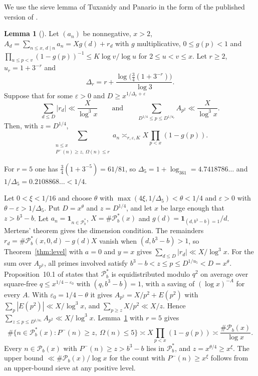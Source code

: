 \documentclass[11pt]{amsart}
\makeatletter
\theoremstyle{definition}
\newtheorem{lemma}[theorem]{Lemma}
\numberwithin{equation}{section}
\renewenvironment{proof}[1][\proofname]{\par\pushQED{\qed}\normalfont\topsep6\p@\@plus6\p@\relax\trivlist\item[\hskip\labelsep\upshape#1.]\ignorespaces}{\popQED\endtrivlist\@endpefalse}
\newcommand{\PP}{\mathscr{P}}
\makeatother
\begin{document}
We use the sieve lemma of Tuxanidy and Panario in the form of the published version of \cite{TP}.

\begin{lemma}[{\cite[Lemma~11.1]{TP}}]\label{lem:sieve}
Let $(a_n)$ be nonnegative, $x>2$, $A_d=\sum_{n\le x,\,d\mid n}a_n=Xg(d)+r_d$ with $g$ multiplicative, $0\le g(p)<1$ and $\prod_{u\le p<v}(1-g(p))^{-1}\le K\log v/\log u$ for $2\le u<v\le x$. Let $r\ge2$, $u_r=1+3^{-r}$ and
\[
\Delta_r=r+\frac{\log\bigl(\frac34(1+3^{-r})\bigr)}{\log3}.
\]
Suppose that for some $\varepsilon>0$ and $D\ge x^{1/\Delta_r+\varepsilon}$
\[
\sum_{d\le D}|r_d|\ll\frac{X}{\log^3x}\qquad\text{and}\qquad\sum_{D^{1/4}\le p\le D^{1/u_r}}A_{p^2}\ll\frac{X}{\log^3x}.
\]
Then, with $z=D^{1/4}$,
\[
\sum_{\substack{n\le x\\P^-(n)\ge z,\ \Omega(n)\le r}}a_n\asymp_{r,\varepsilon,K}X\prod_{p<x}(1-g(p)).
\]
\end{lemma}

For $r=5$ one has $\frac34(1+3^{-5})=61/81$, so $\Delta_5=1+\log_361=4.7418786\ldots$ and $1/\Delta_5=0.2108868\ldots<1/4$.

\begin{proof}[Proof of Corollary~\ref{cor:five}]
Let $0<\xi<1/16$ and choose $\theta$ with $\max(4\xi,1/\Delta_5)<\theta<1/4$ and $\varepsilon>0$ with $\theta-\varepsilon>1/\Delta_5$. Put $D=x^{\theta}$ and $z=D^{1/4}$, and let $x$ be large enough that $z>b^3-b$. Let $a_n=\mathbf 1_{n\in\PP_b^*}$, $X=\#\PP_b^*(x)$ and $g(d)=\mathbf 1_{(d,b^3-b)=1}/d$. Mertens' theorem gives the dimension condition. The remainders $r_d=\#\PP_b^*(x,0,d)-g(d)X$ vanish when $(d,b^3-b)>1$, so Theorem~\ref{thm:level} with $a=0$ and $y=x$ gives $\sum_{d\le D}|r_d|\ll X/\log^3x$. For the sum over $A_{p^2}$, all primes involved satisfy $b^3-b<z\le p\le D^{1/u_5}<D=x^{\theta}$. Proposition~10.1 of \cite{TP} states that $\PP_b^*$ is equidistributed modulo $q^2$ on average over square-free $q\le x^{1/4-\varepsilon_0}$ with $(q,b^3-b)=1$, with a saving of $(\log x)^{-A}$ for every $A$. With $\varepsilon_0=1/4-\theta$ it gives $A_{p^2}=X/p^2+E(p^2)$ with $\sum_p|E(p^2)|\ll X/\log^3x$, and $\sum_{p\ge z}X/p^2\ll X/z$. Hence $\sum_{z\le p\le D^{1/u_5}}A_{p^2}\ll X/\log^3x$. Lemma~\ref{lem:sieve} with $r=5$ gives
\[
\#\{n\in\PP_b^*(x):P^-(n)\ge z,\ \Omega(n)\le5\}\asymp X\prod_{p<x}(1-g(p))\asymp\frac{\#\PP_b(x)}{\log x}.
\]
Every $n\in\PP_b(x)$ with $P^-(n)\ge z>b^3-b$ lies in $\PP_b^*$, and $z=x^{\theta/4}\ge x^{\xi}$. The upper bound $\ll\#\PP_b(x)/\log x$ for the count with $P^-(n)\ge x^{\xi}$ follows from an upper-bound sieve at any positive level.
\end{proof}
\end{document}
